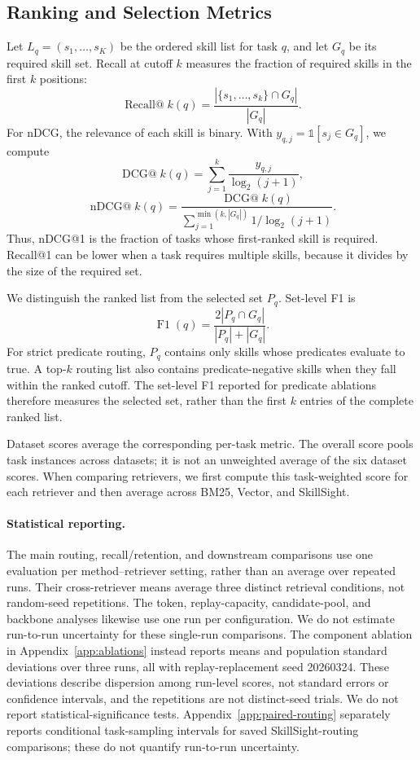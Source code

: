 \subsection{Ranking and Selection Metrics}
\label{app:routing-metrics}
Let $L_q=(s_1,\ldots,s_K)$ be the ordered skill list for task $q$, and let $G_q$ be its required skill set. Recall at cutoff $k$ measures the fraction of required skills in the first $k$ positions:
\[
\operatorname{Recall@}k(q)=\frac{|\{s_1,\ldots,s_k\}\cap G_q|}{|G_q|}.
\]
For nDCG, the relevance of each skill is binary. With $y_{q,j}=\mathds{1}[s_j\in G_q]$, we compute
\[
\operatorname{DCG@}k(q)=\sum_{j=1}^{k}\frac{y_{q,j}}{\log_2(j+1)},
\]
\[
\operatorname{nDCG@}k(q)=\frac{\operatorname{DCG@}k(q)}{\sum_{j=1}^{\min(k,|G_q|)}1/\log_2(j+1)}.
\]
Thus, nDCG@1 is the fraction of tasks whose first-ranked skill is required. Recall@1 can be lower when a task requires multiple skills, because it divides by the size of the required set.

We distinguish the ranked list from the selected set $P_q$. Set-level F1 is
\[
\operatorname{F1}(q)=\frac{2|P_q\cap G_q|}{|P_q|+|G_q|}.
\]
For strict predicate routing, $P_q$ contains only skills whose predicates evaluate to true. A top-$k$ routing list also contains predicate-negative skills when they fall within the ranked cutoff. The set-level F1 reported for predicate ablations therefore measures the selected set, rather than the first $k$ entries of the complete ranked list.

Dataset scores average the corresponding per-task metric. The overall score pools task instances across datasets; it is not an unweighted average of the six dataset scores. When comparing retrievers, we first compute this task-weighted score for each retriever and then average across BM25, Vector, and SkillSight.

\paragraph{Statistical reporting.}
The main routing, recall/retention, and downstream comparisons use one evaluation per method--retriever setting, rather than an average over repeated runs. Their cross-retriever means average three distinct retrieval conditions, not random-seed repetitions. The token, replay-capacity, candidate-pool, and backbone analyses likewise use one run per configuration. We do not estimate run-to-run uncertainty for these single-run comparisons. The component ablation in Appendix~\ref{app:ablations} instead reports means and population standard deviations over three runs, all with replay-replacement seed 20260324. These deviations describe dispersion among run-level scores, not standard errors or confidence intervals, and the repetitions are not distinct-seed trials. We do not report statistical-significance tests. Appendix~\ref{app:paired-routing} separately reports conditional task-sampling intervals for saved SkillSight-routing comparisons; these do not quantify run-to-run uncertainty.
